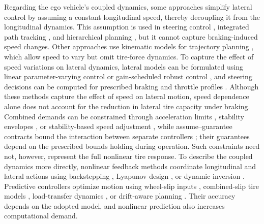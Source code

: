 \documentclass[journal]{IEEEtran}
\theoremstyle{definition}
\begin{document}
Regarding the ego vehicle's coupled dynamics, some approaches simplify
lateral control by assuming a constant longitudinal speed, thereby
decoupling it from the longitudinal dynamics. This assumption is used in
steering control \cite{JiKhajepourMelekHuang2017}, integrated path tracking
\cite{XiongLiuYangLeng2022}, and hierarchical planning
\cite{ChenAksunGuvenc2025}, but it cannot capture braking-induced speed
changes. Other approaches use kinematic models for trajectory planning
\cite{LiZhangGuoLenzoGuo2023}, which allow speed to vary but omit tire-force
dynamics. To capture the effect of speed variations on lateral dynamics,
lateral models can be formulated using linear parameter-varying control
\cite{AtouiSenameMilanesMartinez2022} or gain-scheduled robust control
\cite{LiLamLuLi2022}, and steering decisions can be computed for prescribed
braking and throttle profiles \cite{TurriCarvalhoTsengJohanssonBorrelli2013}.
Although these methods capture the effect of speed on lateral motion, speed
dependence alone does not account for the reduction in lateral tire capacity
under braking. Combined demands can be constrained through acceleration
limits \cite{ChenPengGrizzle2018}, stability envelopes
\cite{ChenChengLiZhaoWang2024}, or stability-based speed adjustment
\cite{AttiaOrjuelaBasset2012,AttiaOrjuelaBasset2014}, while
assume--guarantee contracts bound the interaction between separate controllers
\cite{XuGrizzleTabuadaAmes2018}; their guarantees depend on the prescribed
bounds holding during operation. Such constraints need not, however,
represent the full nonlinear tire response. To describe the coupled dynamics
more directly, nonlinear feedback methods coordinate longitudinal and
lateral actions using backstepping \cite{GuoHuWang2016}, Lyapunov design
\cite{CheblyTaljCharara2017}, or dynamic inversion
\cite{SeoLeeBaekHorowitzChoi2022}. Predictive controllers optimize motion
using wheel-slip inputs \cite{ZhouJiaJingLiuGuvenc2018}, combined-slip tire
models \cite{ZhangJiangLiuHuWangChen2023}, load-transfer dynamics
\cite{ThompsonDallasGohBalachandran2024}, or drift-aware planning
\cite{ZhaoChenGaoYaoGaoHua2024}. Their accuracy depends on the adopted model,
and nonlinear prediction also increases computational demand.
\end{document}
